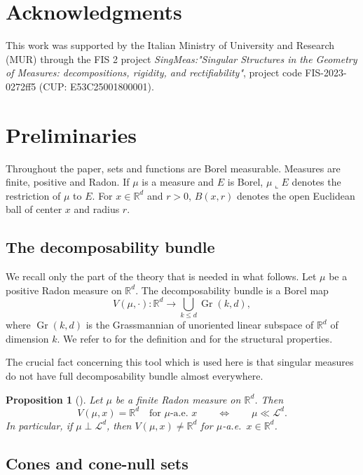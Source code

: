 \documentclass[11pt,a4paper]{article}
\newcommand{\R}{\mathbb{R}}
\newcommand{\LL}{\mathcal{L}}
\newcommand{\Gr}{\operatorname{Gr}}
\newtheorem{prop}[thm]{Proposition}
\theoremstyle{definition}
\theoremstyle{remark}
\begin{document}
\section*{Acknowledgments}

This work was supported by the Italian Ministry of University and Research (MUR) through the FIS 2 project \textit{SingMeas:"Singular Structures in the Geometry of Measures: decompositions, rigidity, and rectifiability"}, project code FIS-2023-0272ff5 (CUP: E53C25001800001).

\section{Preliminaries}

Throughout the paper, sets and functions are Borel measurable.
Measures are finite, positive and Radon.
If $\mu$ is a measure and $E$ is Borel, $\mu\llcorner E$ denotes the restriction of $\mu$ to $E$.
For $x\in\R^d$ and $r>0$, $B(x,r)$ denotes the open Euclidean ball of center $x$ and radius $r$.

\subsection{The decomposability bundle}

We recall only the part of the theory that is needed in what follows.
Let $\mu$ be a positive Radon measure on $\R^d$.
The decomposability bundle is a Borel map
$$
V(\mu,\cdot):\R^d\to \bigcup_{k\le d}\Gr(k,d),
$$
where $\Gr(k,d)$ is the Grassmannian of unoriented linear subspace of $\mathbb{R}^d$ of dimension $k$. We refer to \cite{AM16} for the definition and for the structural properties.

The crucial fact concerning this tool which is used here is that singular measures do not have full decomposability bundle almost everywhere.

\begin{prop}[{\cite[Theorem 2.4]{ABM}}]\label{prop:nonfullbundle}
Let $\mu$ be a finite Radon measure on $\R^d$.
Then
$$
V(\mu,x)=\R^d \quad\text{for $\mu$-a.e.\ }x
\qquad\Longleftrightarrow\qquad
\mu\ll\LL^d.
$$
In particular, if $\mu\perp\LL^d$, then $V(\mu,x)\neq \R^d$ for $\mu$-a.e.\ $x \in \mathbb{R}^d$.
\end{prop}

\subsection{Cones and cone-null sets}
\end{document}
